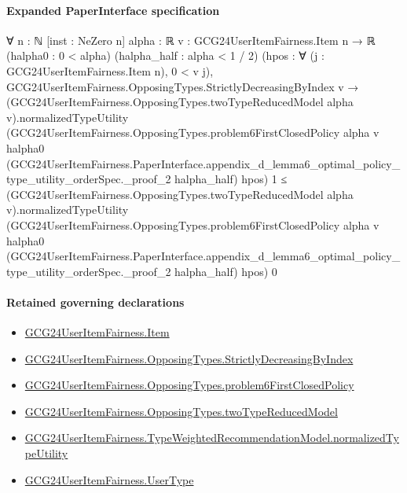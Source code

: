 \documentclass[10pt]{article}
\begin{document}
\paragraph{Expanded PaperInterface specification}
\begin{ReviewVerbatim}
∀ {n : ℕ} [inst : NeZero n] {alpha : ℝ} {v : GCG24UserItemFairness.Item n → ℝ} (halpha0 : 0 < alpha)
  (halpha_half : alpha < 1 / 2) (hpos : ∀ (j : GCG24UserItemFairness.Item n), 0 < v j),
  GCG24UserItemFairness.OpposingTypes.StrictlyDecreasingByIndex v →
    (GCG24UserItemFairness.OpposingTypes.twoTypeReducedModel alpha v).normalizedTypeUtility
        (GCG24UserItemFairness.OpposingTypes.problem6FirstClosedPolicy alpha v halpha0
          (GCG24UserItemFairness.PaperInterface.appendix_d_lemma6_optimal_policy_type_utility_orderSpec._proof_2
            halpha_half)
          hpos)
        1 ≤
      (GCG24UserItemFairness.OpposingTypes.twoTypeReducedModel alpha v).normalizedTypeUtility
        (GCG24UserItemFairness.OpposingTypes.problem6FirstClosedPolicy alpha v halpha0
          (GCG24UserItemFairness.PaperInterface.appendix_d_lemma6_optimal_policy_type_utility_orderSpec._proof_2
            halpha_half)
          hpos)
        0
\end{ReviewVerbatim}

\paragraph{Retained governing declarations}
\begin{itemize}\raggedright
\item \hyperlink{governing-declaration-a7c560a429c6e204}{GCG24\allowbreak{}User\allowbreak{}Item\allowbreak{}Fairness.\allowbreak{}Item}
\item \hyperlink{governing-declaration-8278344d2ddef9a8}{GCG24\allowbreak{}User\allowbreak{}Item\allowbreak{}Fairness.\allowbreak{}Opposing\allowbreak{}Types.\allowbreak{}Strictly\allowbreak{}Decreasing\allowbreak{}By\allowbreak{}Index}
\item \hyperlink{governing-declaration-c9eb0ce285dbfd64}{GCG24\allowbreak{}User\allowbreak{}Item\allowbreak{}Fairness.\allowbreak{}Opposing\allowbreak{}Types.\allowbreak{}problem6\allowbreak{}First\allowbreak{}Closed\allowbreak{}Policy}
\item \hyperlink{governing-declaration-b87168913e966e7f}{GCG24\allowbreak{}User\allowbreak{}Item\allowbreak{}Fairness.\allowbreak{}Opposing\allowbreak{}Types.\allowbreak{}two\allowbreak{}Type\allowbreak{}Reduced\allowbreak{}Model}
\item \hyperlink{governing-declaration-6129f73ad4f3ba0d}{GCG24\allowbreak{}User\allowbreak{}Item\allowbreak{}Fairness.\allowbreak{}Type\allowbreak{}Weighted\allowbreak{}Recommendation\allowbreak{}Model.\allowbreak{}normalized\allowbreak{}Type\allowbreak{}Utility}
\item \hyperlink{governing-declaration-fd2c25ccc96ab645}{GCG24\allowbreak{}User\allowbreak{}Item\allowbreak{}Fairness.\allowbreak{}User\allowbreak{}Type}
\end{itemize}
\end{document}
